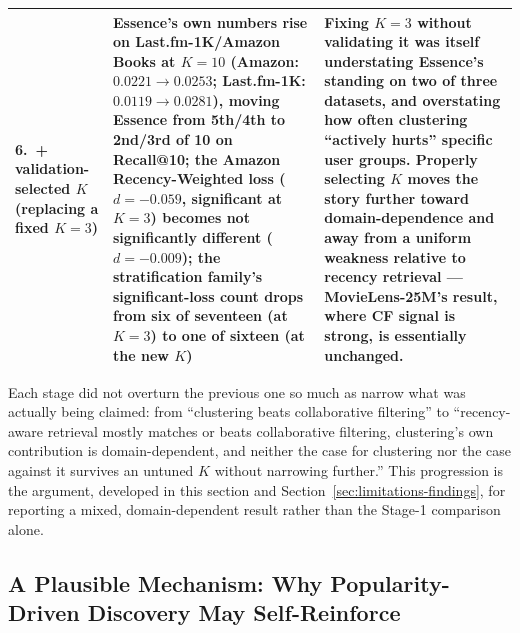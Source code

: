 \documentclass[11pt,a4paper]{article}
\begin{document}
\begin{table}[H]
\begin{tabular}{p{2.5cm}p{4.7cm}p{6.3cm}}
\midrule
6.\ + validation-selected $K$ (replacing a fixed $K=3$) & Essence's own numbers rise on Last.fm-1K/Amazon Books at $K=10$ (Amazon: $0.0221\to0.0253$; Last.fm-1K: $0.0119\to0.0281$), moving Essence from 5th/4th to 2nd/3rd of 10 on Recall@10; the Amazon Recency-Weighted loss ($d=-0.059$, significant at $K=3$) becomes not significantly different ($d=-0.009$); the stratification family's significant-loss count drops from six of seventeen (at $K=3$) to one of sixteen (at the new $K$) & Fixing $K=3$ without validating it was itself understating Essence's standing on two of three datasets, and overstating how often clustering ``actively hurts'' specific user groups. Properly selecting $K$ moves the story further toward domain-dependence and away from a uniform weakness relative to recency retrieval --- MovieLens-25M's result, where CF signal is strong, is essentially unchanged. \\
\bottomrule
\end{tabular}
\end{table}

Each stage did not overturn the previous one so much as narrow what was
actually being claimed: from ``clustering beats collaborative filtering''
to ``recency-aware retrieval mostly matches or beats collaborative
filtering, clustering's own contribution is domain-dependent, and neither
the case for clustering nor the case against it survives an untuned $K$
without narrowing further.'' This progression is
the argument, developed in this section and Section~\ref{sec:limitations-findings},
for reporting a mixed, domain-dependent result rather than the Stage-1
comparison alone.

\subsection{A Plausible Mechanism: Why Popularity-Driven Discovery May Self-Reinforce}
\end{document}
